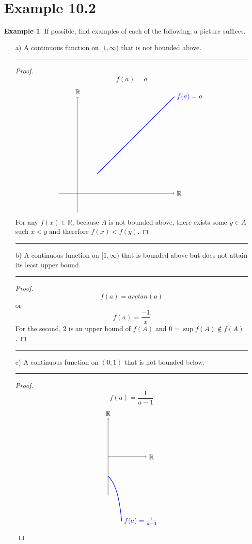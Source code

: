 \documentclass[openany, amssymb, psamsfonts]{amsart}
\newcommand{\bbR}{\mathbb{R}}
\theoremstyle{definition}
\newtheorem{exmp}{Example}[section]
\numberwithin{equation}{section}
\begin{document}
\section*{Example 10.2}
\begin{exmp} 
\label{10.2}
If possible, find examples of each of the following; a picture suffices. 
\begin{enumerate}
\textbf{Note that for the drawings, I was not able to add arrows or open circles or closed circles to the graphs}
\item[a)] A continuous function on $[1,\infty)$ that is not bounded above.
 \vspace{4pt}     \hrule   \vspace{4pt}\begin{proof}
 $$f(a) = a$$
 \[\begin{tikzpicture}
    \draw[->] (-1,0) -- (5,0) node[right] {$\bbR$};
    \draw[->] (0,-1) -- (0,5) node[above] {$\bbR$};
    \draw[domain=1:5, smooth, thick, blue] plot (\x, \x) node[right] {$f(a) = a$};
\end{tikzpicture}\]
For any $f(x) \in \bbR$, because $A$ is not bounded above, there exists some $y\in A$ such $x<y$ and therefore $f(x)<f(y)$.
\end{proof} \vspace{4pt}     \hrule   \vspace{4pt}
\item[b)] A continuous function on $[1,\infty)$ that is bounded above but does not attain its least upper bound.
 \vspace{4pt}     \hrule   \vspace{4pt}\begin{proof}
$$f(a) = arctan(a)$$
or
$$f(a) = \frac{-1}{x}$$
For the second, $2$ is an upper bound of $f(A)$ and $0 = \sup f(A)\notin f(A)$. 
\end{proof} \vspace{4pt}     \hrule   \vspace{4pt}
\item[c)] A continuous function on $(0,1)$ that is not bounded below.
 \vspace{4pt}     \hrule   \vspace{4pt}\begin{proof}
 $$f(a) = \frac{1}{a-1}$$
 \[\begin{tikzpicture}
    \draw[->] (0,0) -- (2,0) node[right] {$\bbR$};
    \draw[->] (0,-2) -- (0,2) node[above] {$\bbR$};
    \draw[domain=0.0001:0.7, smooth, thick, blue] plot (\x, {1/(\x-1)}) node[right] {$f(a) = \frac{1}{a-1}$};

\end{tikzpicture}\]
\end{proof}
\end{enumerate}
\end{exmp}
\end{document}
